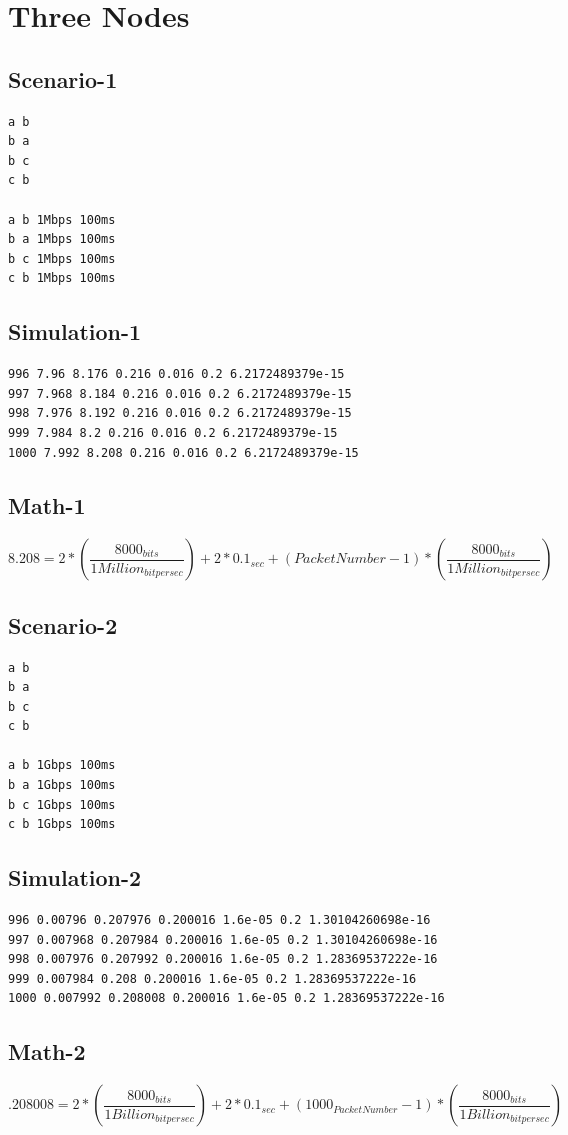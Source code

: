 \documentclass{article}
\begin{document}
\section{Three Nodes}
\subsection{Scenario-1}
\begin{verbatim}
a b
b a
b c
c b

a b 1Mbps 100ms
b a 1Mbps 100ms
b c 1Mbps 100ms
c b 1Mbps 100ms
\end{verbatim}
\subsection{Simulation-1}
\begin{verbatim}
996 7.96 8.176 0.216 0.016 0.2 6.2172489379e-15
997 7.968 8.184 0.216 0.016 0.2 6.2172489379e-15
998 7.976 8.192 0.216 0.016 0.2 6.2172489379e-15
999 7.984 8.2 0.216 0.016 0.2 6.2172489379e-15
1000 7.992 8.208 0.216 0.016 0.2 6.2172489379e-15
\end{verbatim}
\subsection{Math-1}
\begin{equation}
    8.208 = 2 * (\frac{8000_{bits}}{1Million_{bitpersec}}) + 2*0.1_{sec} + (Packet Number - 1) * (\frac{8000_{bits}}{1Million_{bitpersec}}) 
\end{equation}
\subsection{Scenario-2}
\begin{verbatim}
a b
b a
b c
c b

a b 1Gbps 100ms
b a 1Gbps 100ms
b c 1Gbps 100ms
c b 1Gbps 100ms
\end{verbatim}
\subsection{Simulation-2}
\begin{verbatim}
996 0.00796 0.207976 0.200016 1.6e-05 0.2 1.30104260698e-16
997 0.007968 0.207984 0.200016 1.6e-05 0.2 1.30104260698e-16
998 0.007976 0.207992 0.200016 1.6e-05 0.2 1.28369537222e-16
999 0.007984 0.208 0.200016 1.6e-05 0.2 1.28369537222e-16
1000 0.007992 0.208008 0.200016 1.6e-05 0.2 1.28369537222e-16
\end{verbatim}
\subsection{Math-2}
\begin{equation}
    .208008 = 2 * (\frac{8000_{bits}}{1Billion_{bitpersec}}) + 2*0.1_{sec} + (1000_{PacketNumber} - 1) * (\frac{8000_{bits}}{1Billion_{bitpersec}})
\end{equation}
\end{document}
